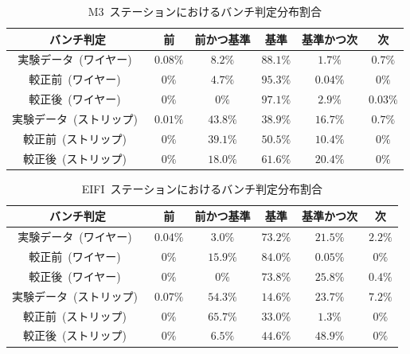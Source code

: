 \begin{table}[htb]
	\centering
	\begin{tabular}{c|c|c|c|c|c}\hline
	バンチ判定&前&前かつ基準&基準&基準かつ次&次 \\ \hline\hline
	実験データ~(ワイヤー)~& $0.08\%$ & $8.2\%$ & $88.1\%$ & $1.7\%$ & $0.7\%$ \\
	較正前~(ワイヤー)~& $0\%$ & $4.7\%$ & $95.3\%$ & $0.04\%$ & $0\%$ \\ 
	較正後~(ワイヤー)~& $0\%$ & $0\%$ & $97.1\%$ & $2.9\%$ & $0.03\%$ \\ \hline
	実験データ~(ストリップ)~& $0.01\%$ & $43.8\%$ & $38.9\%$ & $16.7\%$ & $0.7\%$ \\
	較正前~(ストリップ)~& $0\%$ & $39.1\%$ & $50.5\%$ & $10.4\%$ & $0\%$ \\
	較正後~(ストリップ)~& $0\%$ & $18.0\%$ & $61.6\%$ & $20.4\%$ & $0\%$ \\ \hline
	\end{tabular}
	\caption{M3~ステーションにおけるバンチ判定分布割合}\label{tb:tunebcidM3}
\end{table}

\begin{table}[htb]
	\centering
	\begin{tabular}{c|c|c|c|c|c}\hline
	バンチ判定&前&前かつ基準&基準&基準かつ次&次 \\ \hline\hline
	実験データ~(ワイヤー)~& $0.04\%$ & $3.0\%$ & $73.2\%$ & $21.5\%$ & $2.2\%$ \\
	較正前~(ワイヤー)~& $0\%$ & $15.9\%$ & $84.0\%$ & $0.05\%$ & $0\%$ \\ 
	較正後~(ワイヤー)~& $0\%$ & $0\%$ & $73.8\%$ & $25.8\%$ & $0.4\%$ \\ \hline
	実験データ~(ストリップ)~& $0.07\%$ & $54.3\%$ & $14.6\%$ & $23.7\%$ & $7.2\%$ \\
	較正前~(ストリップ)~& $0\%$ & $65.7\%$ & $33.0\%$ & $1.3\%$ & $0\%$ \\
	較正後~(ストリップ)~& $0\%$ & $6.5\%$ & $44.6\%$ & $48.9\%$ & $0\%$ \\ \hline
	\end{tabular}
	\caption{EIFI~ステーションにおけるバンチ判定分布割合}\label{tb:tunebcidEIFI}
\end{table}

